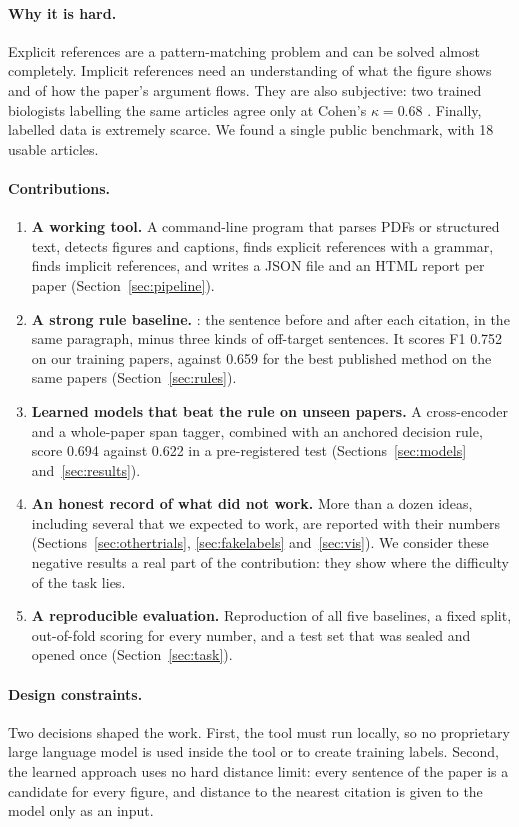 \paragraph{Why it is hard.} Explicit references are a pattern-matching problem and can be solved almost
completely. Implicit references need an understanding of what the figure shows and of how the paper's argument
flows. They are also subjective: two trained biologists labelling the same articles agree only at Cohen's
$\kappa = 0.68$ \citep{ramesh2015figsum}. Finally, labelled data is extremely scarce. We found a single public
benchmark, with 18 usable articles.

\paragraph{Contributions.}
\begin{enumerate}
  \item \textbf{A working tool.} A command-line program that parses PDFs or structured text, detects figures and
        captions, finds explicit references with a grammar, finds implicit references, and writes a JSON file
        and an HTML report per paper (Section~\ref{sec:pipeline}).
  \item \textbf{A strong rule baseline.} \bof{}: the sentence before and after each citation, in the same
        paragraph, minus three kinds of off-target sentences. It scores F1 0.752 on our training papers, against
        0.659 for the best published method on the same papers (Section~\ref{sec:rules}).
  \item \textbf{Learned models that beat the rule on unseen papers.} A cross-encoder and a whole-paper span
        tagger, combined with an anchored decision rule, score 0.694 against 0.622 in a pre-registered test
        (Sections~\ref{sec:models} and~\ref{sec:results}).
  \item \textbf{An honest record of what did not work.} More than a dozen ideas, including several that we
        expected to work, are reported with their numbers (Sections~\ref{sec:othertrials},
        \ref{sec:fakelabels} and~\ref{sec:vis}). We consider these negative results a real part of the
        contribution: they show where the difficulty of the task lies.
  \item \textbf{A reproducible evaluation.} Reproduction of all five \figsum{} baselines, a fixed split,
        out-of-fold scoring for every number, and a test set that was sealed and opened
        once (Section~\ref{sec:task}).
\end{enumerate}

\paragraph{Design constraints.} Two decisions shaped the work. First, the tool must run locally, so no
proprietary large language model is used inside the tool or to create training labels. Second, the learned
approach uses no hard distance limit: every sentence of the paper is a candidate for every figure, and distance
to the nearest citation is given to the model only as an input.
